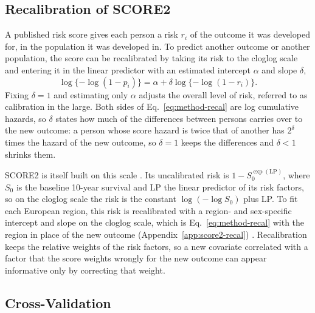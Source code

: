\subsection{Recalibration of SCORE2}
\label{sec:method-recalibration}

A published risk score gives each person a risk $r_i$ of the outcome it was developed for, in the population it was developed in.
To predict another outcome or another population, the score can be recalibrated by taking its risk to the cloglog scale and entering it in the linear predictor with an estimated intercept $\alpha$ and slope $\delta$,
\begin{equation}
  \log\{-\log(1 - p_i)\} = \alpha + \delta \log\{-\log(1 - r_i)\}.
  \label{eq:method-recal}
\end{equation}
Fixing $\delta = 1$ and estimating only $\alpha$ adjusts the overall level of risk, referred to as calibration in the large.
Both sides of Eq.~\eqref{eq:method-recal} are log cumulative hazards, so $\delta$ states how much of the differences between persons carries over to the new outcome: a person whose score hazard is twice that of another has $2^{\delta}$ times the hazard of the new outcome, so $\delta = 1$ keeps the differences and $\delta < 1$ shrinks them.

SCORE2 is itself built on this scale \cite{score2_2021}.
Its uncalibrated risk is $1 - S_0^{\exp(\mathrm{LP})}$, where $S_0$ is the baseline 10-year survival and LP the linear predictor of its risk factors, so on the cloglog scale the risk is the constant $\log(-\log S_0)$ plus LP.
To fit each European region, this risk is recalibrated with a region- and sex-specific intercept and slope on the cloglog scale, which is Eq.~\eqref{eq:method-recal} with the region in place of the new outcome (Appendix~\ref{app:score2-recal}) \cite[Supplementary Methods, Table~4]{score2_2021}.
Recalibration keeps the relative weights of the risk factors, so a new covariate correlated with a factor that the score weights wrongly for the new outcome can appear informative only by correcting that weight.

\subsection{Cross-Validation}
\label{sec:method-cv}

